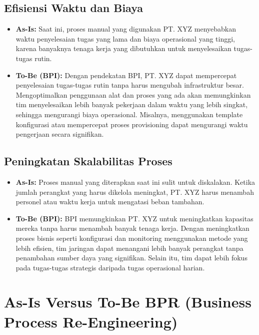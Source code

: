 \subsection{Efisiensi Waktu dan Biaya}

\begin{itemize}
    \item \textbf{As-Is:} Saat ini, proses manual yang digunakan PT. XYZ menyebabkan waktu penyelesaian tugas yang lama dan biaya operasional yang tinggi, karena banyaknya tenaga kerja yang dibutuhkan untuk menyelesaikan tugas-tugas rutin.

    \item \textbf{To-Be (BPI):} Dengan pendekatan BPI, PT. XYZ dapat mempercepat penyelesaian tugas-tugas rutin tanpa harus mengubah infrastruktur besar. Mengoptimalkan penggunaan alat dan proses yang ada akan memungkinkan tim menyelesaikan lebih banyak pekerjaan dalam waktu yang lebih singkat, sehingga mengurangi biaya operasional. Misalnya, menggunakan template konfigurasi atau mempercepat proses provisioning dapat mengurangi waktu pengerjaan secara signifikan.
\end{itemize}

\subsection{Peningkatan Skalabilitas Proses}

\begin{itemize}
    \item \textbf{As-Is:} Proses manual yang diterapkan saat ini sulit untuk diskalakan. Ketika jumlah perangkat yang harus dikelola meningkat, PT. XYZ harus menambah personel atau waktu kerja untuk mengatasi beban tambahan.

    \item \textbf{To-Be (BPI):} BPI memungkinkan PT. XYZ untuk meningkatkan kapasitas mereka tanpa harus menambah banyak tenaga kerja. Dengan meningkatkan proses bisnis seperti konfigurasi dan monitoring menggunakan metode yang lebih efisien, tim jaringan dapat menangani lebih banyak perangkat tanpa penambahan sumber daya yang signifikan. Selain itu, tim dapat lebih fokus pada tugas-tugas strategis daripada tugas operasional harian.
\end{itemize}

\section{As-Is Versus To-Be BPR (Business Process Re-Engineering)}

